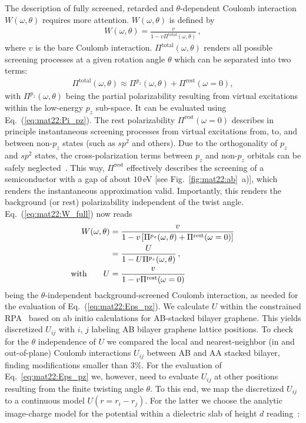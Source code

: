 The description of fully screened, retarded and $\theta$-dependent Coulomb interaction $W(\omega, \theta)$ requires more attention. $W(\omega, \theta)$ is defined by 
\begin{align}\label{eq:mat22:W_full}
    W(\omega, \theta) = \frac{v}{1 - v \Pi^\text{total}(\omega, \theta)} \,,
\end{align}
where $v$ is the bare Coulomb interaction. $\Pi^\text{total}(\omega, \theta)$ renders all possible screening processes at a given rotation angle $\theta$ which can be separated into two terms:
\begin{align*}
     \Pi^\text{total}(\omega, \theta) \approx 
         \Pi^{p_z}(\omega, \theta) + \Pi^\text{rest}(\omega = 0),
\end{align*}
with $\Pi^{p_z}(\omega, \theta)$ being the partial polarizability resulting from virtual excitations within the low-energy $p_z$ sub-space. It can be evaluated using Eq.~(\ref{eq:mat22:Pi_pz}). The rest polarizability $\Pi^\text{rest}(\omega = 0)$ describes in principle instantaneous screening processes from virtual excitations from, to, and between non-$p_z$ states (such as $sp^2$ and others). Due to the orthogonality of $p_z$ and $sp^2$ states, the cross-polarization terms between $p_z$ and non-$p_z$ orbitals can be safely neglected~\cite{van_loon_random_2021}. This way, $\Pi^\text{rest}$ effectively describes the screening of a semiconductor with a gap of about $10\,$eV [see Fig.~\ref{fig:mat22:ab}~a)], which renders the  instantaneous approximation valid. Importantly, this renders the background (or rest) polarizability independent of the twist angle. Eq.~(\ref{eq:mat22:W_full}) now reads
\begin{align*}
    W(\omega, \theta) 
    &= \frac{v}{1 - v \left[\Pi^{p_z}(\omega, \theta) + \Pi^\text{rest}(\omega = 0)\right]}\\
    &= \frac{U}{1 - U \Pi^{p_z}(\omega, \theta)}\,, \notag \\
    \text{with} \qquad U &= \frac{v}{1 - v \Pi^\text{rest}(\omega = 0)}
\end{align*}
being the $\theta$-independent background-screened Coulomb interaction, as needed for the evaluation of Eq.~(\ref{eq:mat22:Eps_pz}). We calculate $U$ within the constrained RPA~\cite{cRPA} based on ab initio calculations for AB-stacked bilayer graphene.%
This yields discretized $U_{ij}$ with $i$, $j$ labeling AB bilayer graphene lattice positions. To check for the $\theta$ independence of $U$ we compared the local and nearest-neighbor (in and out-of-plane) Coulomb interactions $U_{ij}$ between AB and AA stacked bilayer, finding modifications smaller than $3\%$. For the evaluation of Eq.~\eqref{eq:mat22:Eps_pz} we, however, need to evaluate $U_{ij}$ at other positions resulting from the finite twisting angle $\theta$. To this end, we map the discretized $U_{ij}$ to a continuous model $U(r = r_i - r_j)$. For the latter we choose the analytic image-charge model for the potential within a dielectric slab of height $d$ reading~\cite{keldysh_coulomb_1979,jena_enhancement_2007,emelyanenko_effect_2008,jiang_plasmonic_2021}:
